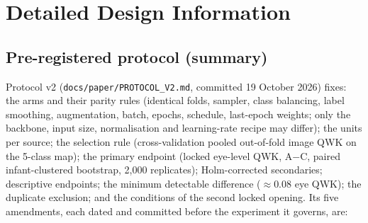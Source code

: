 \chapter{Detailed Design Information}\label{app:design}
\section*{Pre-registered protocol (summary)}
Protocol v2 (\texttt{docs/paper/PROTOCOL\_V2.md}, committed 19 October 2026) fixes: the arms and their parity rules (identical folds, sampler, class balancing, label smoothing, augmentation, batch, epochs, schedule, last-epoch weights; only the backbone, input size, normalisation and learning-rate recipe may differ); the units per source; the selection rule (cross-validation pooled out-of-fold image QWK on the 5-class map); the primary endpoint (locked eye-level QWK, A$-$C, paired infant-clustered bootstrap, 2{,}000 replicates); Holm-corrected secondaries; descriptive endpoints; the minimum detectable difference ($\approx$0.08 eye QWK); the duplicate exclusion; and the conditions of the second locked opening. Its five amendments, each dated and committed before the experiment it governs, are:

